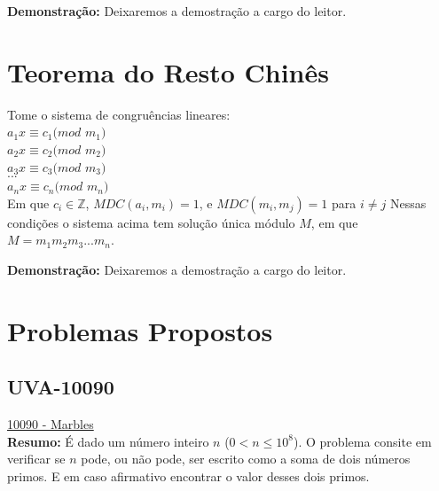 \textbf{Demonstração:}
Deixaremos a demostração a cargo do leitor.






\section{Teorema do Resto Chinês}

\begin{theorem}
Tome o sistema de congruências lineares:\\

$a_1x \equiv c_1 (mod$ $m_1)$\\
$a_2x \equiv c_2 (mod$ $m_2)$\\
$a_3x \equiv c_3 (mod$ $m_3)$\\
$...$\\
$a_nx \equiv c_n (mod$ $m_n)$\\

Em que $c_i \in \mathbb{Z}$, $MDC(a_i,m_i) = 1$, e $MDC(m_i, m_j) = 1$ para $i \neq j$
Nessas condições o sistema acima tem solução única módulo $M$, em que $M = m_1m_2m_3...m_n$.
\end{theorem}
\textbf{Demonstração:}
Deixaremos a demostração a cargo do leitor.


\section{Problemas Propostos}



\subsection{UVA-10090}
\href{https://uva.onlinejudge.org/index.php?option=onlinejudge&page=show_problem&problem=1031}{10090 - Marbles}\\


\textbf{Resumo:}
É dado um número inteiro $n$ ($0 < n \leq 10^8$). O problema consite em verificar se $n$ pode, ou não pode, ser escrito como a soma de dois números primos.
E em caso afirmativo encontrar o valor desses dois primos.
\\

